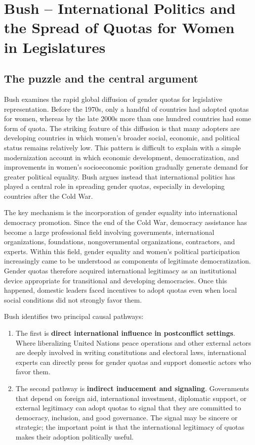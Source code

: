 \clearpage
\section{Bush -- International Politics and the Spread of Quotas for Women in Legislatures}

\subsection{The puzzle and the central argument}

Bush examines the rapid global diffusion of gender quotas for legislative representation. Before the 1970s, only a handful of countries had adopted quotas for women, whereas by the late 2000s more than one hundred countries had some form of quota. The striking feature of this diffusion is that many adopters are developing countries in which women's broader social, economic, and political status remains relatively low. This pattern is difficult to explain with a simple modernization account in which economic development, democratization, and improvements in women's socioeconomic position gradually generate demand for greater political equality. Bush argues instead that international politics has played a central role in spreading gender quotas, especially in developing countries after the Cold War.

The key mechanism is the incorporation of gender equality into international democracy promotion. Since the end of the Cold War, democracy assistance has become a large professional field involving governments, international organizations, foundations, nongovernmental organizations, contractors, and experts. Within this field, gender equality and women's political participation increasingly came to be understood as components of legitimate democratization. Gender quotas therefore acquired international legitimacy as an institutional device appropriate for transitional and developing democracies. Once this happened, domestic leaders faced incentives to adopt quotas even when local social conditions did not strongly favor them.

Bush identifies two principal causal pathways:
\begin{enumerate}
    \item The first is \textbf{direct international influence in postconflict settings}. Where liberalizing United Nations peace operations and other external actors are deeply involved in writing constitutions and electoral laws, international experts can directly press for gender quotas and support domestic actors who favor them.

    \item The second pathway is \textbf{indirect inducement and signaling}. Governments that depend on foreign aid, international investment, diplomatic support, or external legitimacy can adopt quotas to signal that they are committed to democracy, inclusion, and good governance. The signal may be sincere or strategic; the important point is that the international legitimacy of quotas makes their adoption politically useful.
\end{enumerate}

